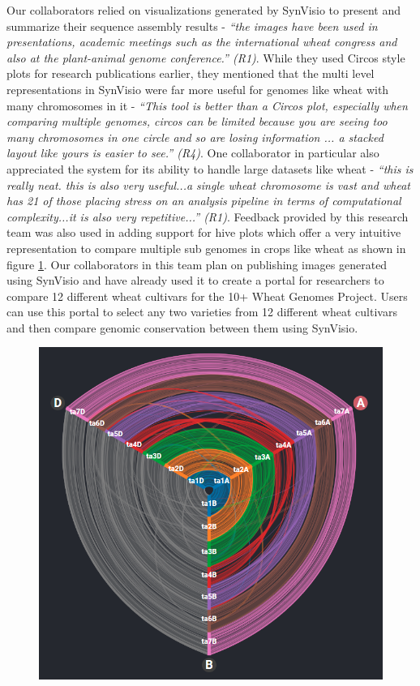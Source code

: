 Our collaborators relied on visualizations generated by SynVisio to present and summarize their sequence assembly results - \textit{``the images have been used in presentations, academic meetings such as the international wheat congress and also at the plant-animal genome conference.'' (R1)}. While they used Circos style plots for research publications earlier, they mentioned that the multi level representations in SynVisio were far more useful for genomes like wheat with many chromosomes in it - \textit{``This tool is better than a Circos plot, especially when comparing multiple genomes, circos can be limited because you are seeing too many chromosomes in one circle and so are losing information ... a stacked layout like yours is easier to see.'' (R4)}. One collaborator in particular also appreciated the system for its ability to handle large datasets like wheat - \textit{``this is really neat. this is also very useful...a single wheat chromosome is vast and wheat has 21 of those placing stress on an analysis pipeline in terms of computational complexity...it is also very repetitive...'' (R1)}.
Feedback provided by this research team was also used in adding support for hive plots which offer a very intuitive representation to compare multiple sub genomes in crops like wheat as shown in figure \ref{fig:ch_6_wheat}. Our collaborators in this team plan on publishing images generated using SynVisio and have already used it to create a portal for researchers to compare 12 different wheat cultivars for the 10+ Wheat Genomes Project. Users can use this portal to select any two varieties from 12 different wheat cultivars and then compare genomic conservation between them using SynVisio\cite{10wheat,wheatinfogithub}.

\begin{figure}
  \centering
  \includegraphics[width=0.72\linewidth]{images/ch_6_wheat.PNG}
  \label{fig:ch_6_wheat}
\end{figure}


